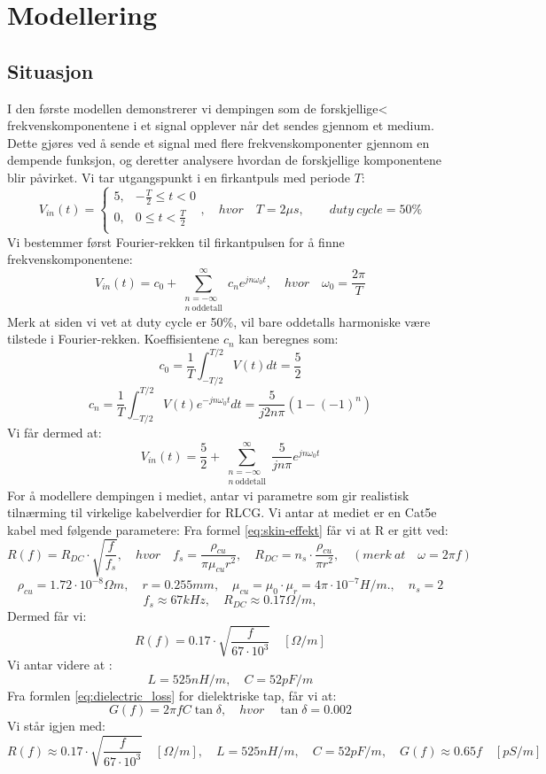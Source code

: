 \section{Modellering}
\subsection{Situasjon}
I den første modellen demonstrerer vi dempingen som de forskjellige< frekvenskomponentene i et signal opplever når det sendes gjennom et medium. Dette gjøres ved å sende et signal med flere frekvenskomponenter gjennom en dempende funksjon, og deretter analysere hvordan de forskjellige komponentene blir påvirket.
Vi tar utgangspunkt i en firkantpuls med periode $T$:
\[
    V_{in}(t) = \begin{cases}
        5, & -\frac{T}{2} \leq t < 0 \\
        0, & 0 \leq t < \frac{T}{2} \\
    \end{cases}, \quad hvor \quad T = 2 \mu s,\qquad duty\ cycle = 50\%
\]
Vi bestemmer først Fourier-rekken til firkantpulsen for å finne frekvenskomponentene:
\[
    V_{in}(t) = c_0 + \sum_{\substack{n=-\infty\\ n\ \text{oddetall}}}^{\infty} c_n e^{j n \omega_0 t}, \quad hvor \quad \omega_0 = \frac{2\pi}{T}
\]
Merk at siden vi vet at duty cycle er 50\%, vil bare oddetalls harmoniske være tilstede i Fourier-rekken.
Koeffisientene $c_n$ kan beregnes som:
\[
    c_0 = \frac{1}{T} \int_{-T/2}^{T/2} V(t) dt = \frac{5}{2}
\]
\[
    c_n = \frac{1}{T} \int_{-T/2}^{T/2} V(t) e^{-j n \omega_0 t} dt =  \frac{5}{j 2 n \pi} (1 - (-1)^n)
\]
Vi får dermed at:
\[
    V_{in}(t) = \frac{5}{2} + \sum_{\substack{n=-\infty\\ n\ \text{oddetall}}}^{\infty} \frac{5}{j n \pi} e^{j n \omega_0 t}
\]
For å modellere dempingen i mediet, antar vi parametre som gir realistisk tilnærming til virkelige kabelverdier for RLCG.
Vi antar at mediet er en Cat5e kabel med følgende parametere:
Fra formel \eqref{eq:skin-effekt} får vi at R er gitt ved:
\[
    R(f) = R_{DC} \cdot \sqrt{\frac{f}{f_{s}}}, \quad hvor \quad f_{s} = \frac{\rho_{cu}}{\pi \mu_{cu} r^2}, \quad R_{DC} = n_s \cdot \frac{\rho_{cu}}{\pi r^2}, \quad (merk\ at \quad \omega = 2\pi f)
\]
\[
    \rho_{cu} = 1.72 \cdot 10^{-8} \Omega m, \quad r = 0.255 mm, \quad \mu_{cu} = \mu_0 \cdot \mu_r = 4\pi \cdot 10^{-7} H/m., \quad n_s = 2
\]
\[
    f_s \approx 67kHz, \quad R_{DC} \approx 0.17 \Omega/m,
\]
Dermed får vi:
\[
    R(f) = 0.17 \cdot \sqrt{\frac{f}{67 \cdot 10^3}} \quad [\Omega/m]
\]
Vi antar videre at \cite{Cat5e_Characteristics}:
\[
    L = 525 nH/m, \quad C = 52 pF/m
\]
Fra formlen \eqref{eq:dielectric_loss} for dielektriske tap, får vi at:
\[
    G(f) = 2\pi f C \tan \delta, \quad hvor \quad \tan \delta = 0.002
\]
\clearpage
\noindent Vi står igjen med:
\[
    R(f) \approx 0.17 \cdot \sqrt{\frac{f}{67 \cdot 10^3}} \quad [\Omega/m], \quad L = 525 nH/m, \quad C = 52 pF/m, \quad G(f) \approx 0.65f \quad [pS/m]
\]

